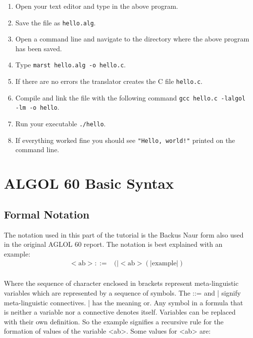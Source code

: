 \documentclass{article}
\begin{document}
\begin{enumerate}
	\item Open your text editor and type in the above program.
	\item Save the file as \texttt{hello.alg}.
	\item Open a command line and navigate to the directory where the above program has been saved.
	\item Type \texttt{marst hello.alg -o hello.c}.
	\item If there are no errors the translator creates the C file \texttt{hello.c}.
	\item Compile and link the file with the following command \texttt{gcc hello.c -lalgol -lm -o hello}.
	\item Run your executable \texttt{./hello}.
	\item If everything worked fine you should see \texttt{"Hello, world!"} printed on the command line.
\end{enumerate}

\newpage

\section{ALGOL 60 Basic Syntax}

\subsection{Formal Notation}
The notation used in this part of the tutorial is the Backus Naur form also used in the original AGLOL 60 report. The notation is best explained with an example:\\

\begin{equation} \label{eq1}
\begin{split}
<\text{ab}> ::=&( |<\text{ab}>(|\text{example}|)  \\
\end{split}
\end{equation}

Where the sequence of character enclosed in brackets represent meta-linguistic variables which are represented by a sequence of symbols. The ::= and | signify meta-linguistic connectives. | has the meaning or. Any symbol in a formula that is neither a variable nor a connective denotes itself. Variables can be replaced with their own definition. So the example signifies a recursive rule for the formation of values of the variable <ab>. Some values for <ab> are:\\
\end{document}
